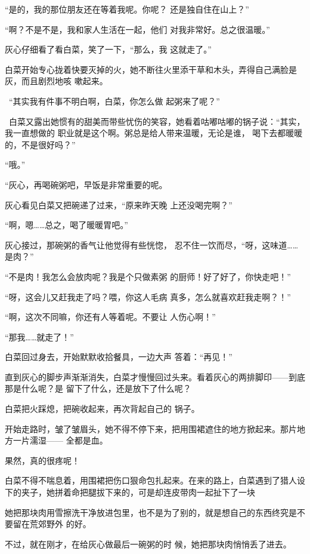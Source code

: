 \documentclass{article}
\begin{document}
“是的，我的那位朋友还在等着我呢。你呢？
还是独自住在山上？” 

“啊？不是不是，我和家人生活在一起，他们
对我非常好。总之很温暖。” 

灰心仔细看了看白菜，笑了一下，“那么，我
这就走了。” 

白菜开始专心拢着快要灭掉的火，她不断往火里添干草和木头，弄得自己满脸是灰，而且剧烈地咳
嗽起来。 

 “其实我有件事不明白啊，白菜，你怎么做
起粥来了呢？” 

 白菜又露出她惯有的甜美而带些忧伤的笑容，她看着咕嘟咕嘟的锅子说：“其实，我一直想做的
\newpage
职业就是这个啊。粥总是给人带来温暖，无论是谁，
喝下去都暖暖的，不是很好吗？” 


“哦。” 

“灰心，再喝碗粥吧，早饭是非常重要的呢。

灰心看见白菜又把碗递了过来，“原来昨天晚
上还没喝完啊？” 


“啊，嗯……总之，喝了暖暖胃吧。” 

灰心接过，那碗粥的香气让他觉得有些恍惚，
忍不住一饮而尽，“呀，这味道……是肉？” 

“不是肉！我怎么会放肉呢？我是个只做素粥
的厨师！好了好了，你快走吧！” 

“呀，这会儿又赶我走了吗？喂，你这人毛病
真多，怎么就喜欢赶我走啊？！” 

\newpage

“啊，这次不同嘛，你还有人等着呢。不要让
人伤心啊！” 


“那我……就走了！” 

白菜回过身去，开始默默收拾餐具，一边大声
答着：“再见！” 

直到灰心的脚步声渐渐消失，白菜才慢慢回过头来。看着灰心的两排脚印——到底那是什么呢？是
留下了什么，还是放下了什么呢？ 

白菜把火踩熄，把碗收起来，再次背起自己的
锅子。 

开始走路时，皱了皱眉头，她不得不停下来，把用围裙遮住的地方掀起来。那片地方一片濡湿——
全都是血。 


果然，真的很疼呢！ 

\newpage

白菜不得不喘息着，用围裙把伤口狠命包扎起来。在来的路上，白菜遇到了猎人设下的夹子，她拼着命把腿拔下来的，可是却连皮带肉一起扯下了一块

她把那块肉用雪擦洗干净放进包里，也不是为了别的，就是想自己的东西终究是不要留在荒郊野外
的好。 

不过，就在刚才，在给灰心做最后一碗粥的时
候，她把那块肉悄悄丢了进去。 
\end{document}

